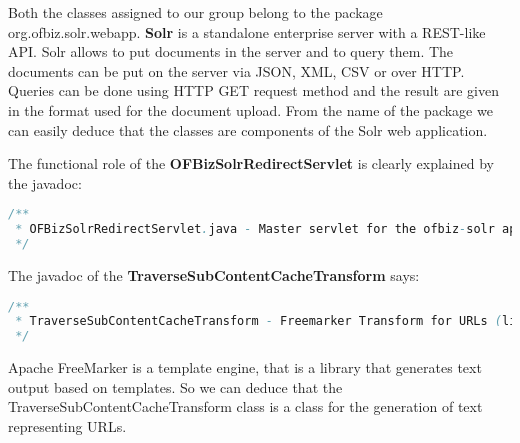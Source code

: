 Both the classes assigned to our group belong to the package org.ofbiz.solr.webapp. \textbf{Solr} is a standalone enterprise server with a REST-like API. Solr allows to put documents in the server and to query them. The documents can be put on the server via JSON, XML, CSV or over HTTP. Queries can be done using HTTP GET request method and the result are given in the format used for the document upload. From the name of the package we can easily deduce that the classes are components of the Solr web application.
\par

The functional role of the \textbf{OFBizSolrRedirectServlet} is clearly explained by the javadoc:
\begin{lstlisting}[language=java]
/**
 * OFBizSolrRedirectServlet.java - Master servlet for the ofbiz-solr application.
 */
\end{lstlisting}

The javadoc of the \textbf{TraverseSubContentCacheTransform} says:
\begin{lstlisting}[language=java]
/**
 * TraverseSubContentCacheTransform - Freemarker Transform for URLs (links)
 */
\end{lstlisting}
Apache FreeMarker is a template engine, that is a library that generates text output based on templates. So we can deduce that the TraverseSubContentCacheTransform class is a class for the generation of text representing URLs.	
